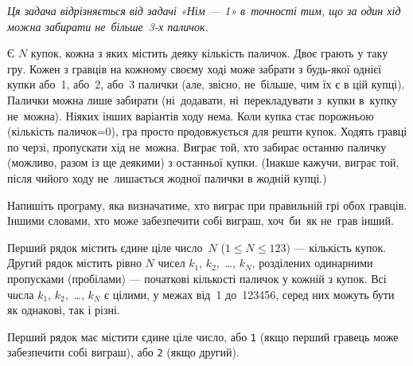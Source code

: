 ﻿{\it Ця задача відрізняється від задачі «Нім — 1» в~точності тим, що за один хід можна забирати не~більше~3-х паличок.}

Є $N$ купок, кожна з яких містить деяку кількість паличок.
Двоє грають у таку гру.
Кожен з гравців на кожному своєму ході може забрати з будь-якої однієї купки або~1, або~2, або~3 палички (але, звісно, не~більше, чим їх є в цій купці). Палички можна лише забирати (ні~додавати, ні~перекладувати з~купки в~купку не~можна).
Ніяких інших варіантів ходу нема. 
Коли купка стає порожньою (кількість паличок=0), гра просто продовжується для решти купок.
Ходять гравці по черзі, пропускати хід не~можна.
Виграє той, хто забирає останню паличку (можливо, разом із ще деякими) з останньої купки.
(Інакше кажучи, виграє той, після чийого ходу не~лишається жодної палички в жодній купці.)

Напишіть програму, яка визначатиме, хто виграє при правильній грі обох гравців. 
Іншими словами, хто може забезпечити собі виграш, хоч~би~як не~грав інший.

\InputFile
Перший рядок містить єдине ціле число~$N$ ($1\leqslant N\leqslant 123$) --- кількість купок.
Др{\it у}гий рядок містить рівно $N$ чисел $k_1$, $k_2$,~\dots, $k_N$, розділених одинарними пропусками (пробілами) --- початкові кількості паличок у кожній з купок. Всі ч{\it и}сла $k_1$, $k_2$,~\dots, $k_N$ є цілими, у межах від~1 до~123456, серед них можуть бути як однакові, так і різні.

\OutputFile
Перший рядок має містити єдине ціле число, або \texttt{1} (якщо перший гравець може забезпечити собі виграш), або \texttt{2} (якщо др{\it у}гий).

\Examples

\begin{example}
%
\end{example}
